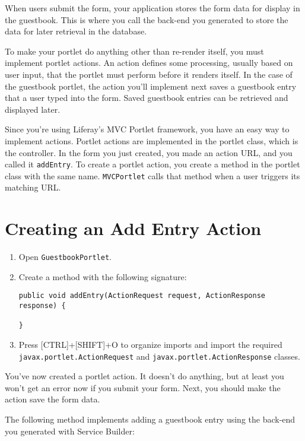 When users submit the form, your application stores the form data for
display in the guestbook. This is where you call the back-end you
generated to store the data for later retrieval in the database.

To make your portlet do anything other than re-render itself, you must
implement portlet actions. An action defines some processing, usually
based on user input, that the portlet must perform before it renders
itself. In the case of the guestbook portlet, the action you'll
implement next saves a guestbook entry that a user typed into the form.
Saved guestbook entries can be retrieved and displayed later.

Since you're using Liferay's MVC Portlet framework, you have an easy way
to implement actions. Portlet actions are implemented in the portlet
class, which is the controller. In the form you just created, you made
an action URL, and you called it \texttt{addEntry}. To create a portlet
action, you create a method in the portlet class with the same name.
\texttt{MVCPortlet} calls that method when a user triggers its matching
URL.

\section{Creating an Add Entry
Action}\label{creating-an-add-entry-action}

\begin{enumerate}
\def\labelenumi{\arabic{enumi}.}
\item
  Open \texttt{GuestbookPortlet}.
\item
  Create a method with the following signature:

\begin{verbatim}
public void addEntry(ActionRequest request, ActionResponse response) {

}
\end{verbatim}
\item
  Press {[}CTRL{]}+{[}SHIFT{]}+O to organize imports and import the
  required \texttt{javax.portlet.ActionRequest} and
  \texttt{javax.portlet.ActionResponse} classes.
\end{enumerate}

You've now created a portlet action. It doesn't do anything, but at
least you won't get an error now if you submit your form. Next, you
should make the action save the form data.

The following method implements adding a guestbook entry using the
back-end you generated with Service Builder:

